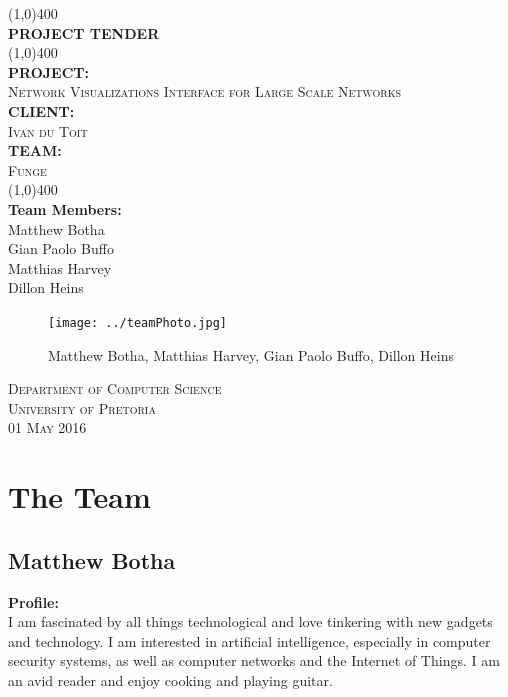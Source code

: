 \documentclass{article}
\begin{document}
\begin{titlepage}
	\begin{center}
		\line(1,0){400}\\
		[6mm]
		\huge{\bfseries PROJECT TENDER}\\
		[2mm]
		\line(1,0){400}\\
		[5mm]
		\large\textbf{PROJECT:}\\\textsc{Network Visualizations Interface for Large Scale Networks}\\
		[3mm]
		\large\textbf{CLIENT:}\\\textsc{Ivan du Toit}\\
		[3mm]
		\large \textbf{TEAM:}\\\textsc{Funge}\\
		\line(1,0){400}\\
		[5mm]
		\large \textbf{Team Members:}\\
		[3mm]
		\large Matthew Botha\\
		\large Gian Paolo Buffo\\
		\large Matthias Harvey\\
        \large Dillon Heins\\[3mm]
		\begin{figure}[H]
			\centering
			\texttt{[image: ../teamPhoto.jpg]}
			\caption{Matthew Botha, Matthias Harvey, Gian Paolo Buffo, Dillon Heins}
		\end{figure}
    \end{center}

	\vspace{7mm}

    \begin{flushright}
        \textsc{\large Department of Computer Science\\
        University of Pretoria\\
        01 May 2016\\}
    \end{flushright}
\end{titlepage}

\section{The Team}
	\subsection{Matthew Botha}
		\textbf{Profile:}\\
		I am fascinated by all things technological and love tinkering with new gadgets and technology. I am interested in artificial intelligence, especially in computer security systems, as well as computer networks and the Internet of Things. I am an avid reader and enjoy cooking and playing guitar.
\end{document}

